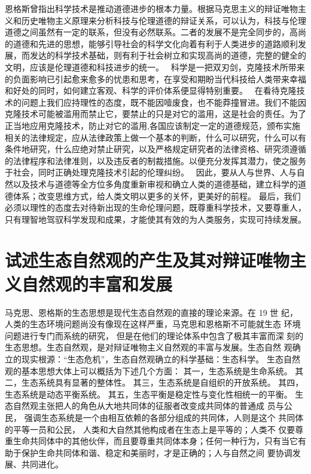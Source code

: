 \documentclass[a4paper]{article}
\begin{document}
恩格斯曾指出科学技术是推动道德进步的根本力量。根据马克思主义的辩证唯物主义和历史唯物主义原理来分析科技与伦理道德的辩证关系，可以认为，科技与伦理道德之间虽然有一定的联系，但没有必然联系。二者的发展不是完全同步的，高尚的道德和先进的思想，能够引导社会的科学文化向着有利于人类进步的道路顺利发展，而发达的科学技术基础，则有利于社会树立和实现高尚的道德，完整的健全的文明，应该是伦理道德和科技进步的统一。 
科学是一把双刃剑，克隆技术所带来的负面影响已引起愈来愈多的忧患和思考，在享受和期盼当代科技给人类带来幸福和好处的同时，如何建立客观、科学的评价体系便显得特别重要。 
在看待克隆技术的问题上我们应持理性的态度，既不能因噎废食，也不能莽撞冒进。我们不能因克隆技术可能被滥用而禁止它，要禁止的只是对它的滥用，这是社会的责任。为了正当地应用克隆技术，防止对它的滥用,各国应该制定一定的道德规范，颁布实施相关的法律规定，应从法律政策上做一个基本的判断，什么可以研究，什么可以有条件地研究，什么应绝对禁止研究，以及严格规定研究者的法律资格、研究须遵循的法律程序和法律准则，以及违反者的制裁措施。以便充分发挥其潜力，使之服务于社会，同时正确处理克隆技术引起的伦理纠纷。 
因此，要从人与世界、人与自然以及技术与道德等全方位多角度重新审视和确立人类的道德基础，建立科学的道德体系；改变思维方式，给人类文明以更多的关怀，更美好的前程。
最后，我们必须以理性的态度去对待新出现的生命伦理问题，既尊重科学技术，又要尊重人，只有理智地驾驭科学发现和成果，才能使其有效的为人类服务，实现可持续发展。

\section{试述生态自然观的产生及其对辩证唯物主义自然观的丰富和发展}

马克思、恩格斯的生态思想是现代生态自然观的直接的理论来源。在 19 世 纪， 人类的生态环境问题尚没有像现在这样严重，马克思和恩格斯不可能就生态 环境问题进行专门而系统的研究， 但是在他们的理论体系中包含了极其丰富而深 刻的生态思想。生态自然观，是对辩证唯物主义自然观的丰富与发展。生态自然 观确立的现实根源：“生态危机”，生态自然观确立的科学基础：生态科学。 生态自然观的基本思想大体上可以概括为下述几个方面： 其一，生态系统是生命系统。 其二，生态系统具有显著的整体性。 其三，生态系统是自组织的开放系统。 其四，生态系统是动态平衡系统。 其五，生态平衡是稳定性与变化性相统一的平衡。 生态自然观主张把人的角色从大地共同体的征服者改变成共同体的普通成 员与公民， 强调生态系统是一个由相互依赖的各部分组成的共同体，人则是这个 共同体的平等一员和公民， 人类和大自然其他构成者在生态上是平等的；人类不 仅要尊重生命共同体中的其他伙伴，而且要尊重共同体本身；任何一种行为，只有当它有助于保护生命共同体和谐、稳定和美丽时，才是正确的；人与自然之间 要协调发展、共同进化。 
\end{document}
